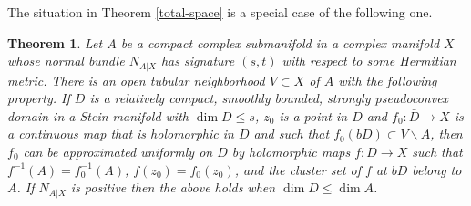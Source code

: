 \documentclass[11pt]{amsart}
\numberwithin{equation}{section}
\newtheorem{theorem}{Theorem}[section]
\theoremstyle{definition}
\begin{document}
The situation in Theorem \ref{total-space} is a special
case of the following one.
 

\begin{theorem}
\label{complements}
Let $A$ be a compact complex submanifold in a complex manifold $X$
whose normal bundle $N_{A|X}$ has signature $(s,t)$ 
with respect to some Hermitian metric. There is an open
tubular neighborhood $V\subset X$ of $A$ with the following property.
If $D$ is a relatively compact, smoothly bounded, 
strongly pseudoconvex domain in a Stein manifold
with $\dim D \le s$, $z_0$ is a point in $D$ and $f_0\colon\bar D\to X$ is 
a continuous map that is holomorphic in $D$ and such that  
$f_0(bD) \subset V{\backslash} A$, then $f_0$ can be approximated uniformly
on $D$ by holomorphic maps $f\colon D\to X$ such that
$f^{-1}(A)=f^{-1}_0(A)$, $f(z_0)=f_0(z_0)$, and the cluster set 
of $f$ at $bD$ belong to $A$. If $N_{A|X}$ is positive 
then the above holds when $\dim D \le \dim A$.
\end{theorem}
\end{document}
